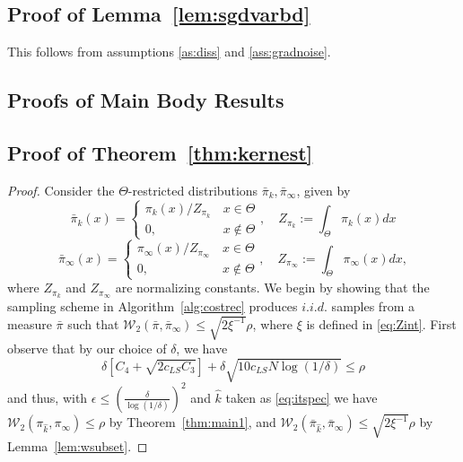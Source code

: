 \documentclass[journal,onecolumn]{IEEEtran}
\newcommand{\step}{\epsilon}
\newcommand{\dimn}{N}
\newcommand{\wass}{\mathcal{W}_2}
\newcommand{\gibbs}{\ids_{\infty}}
\newcommand{\dtlaw}{\ids_{k}} %
\newcommand{\LSconst}{c_{LS}}
\newcommand{\ids}{\pi}
\newcommand{\idw}{\gamma}
\newcommand{\ksp}{k,\idw}
\newcommand{\wassprox}{\rho}
\newcommand{\zconst}{\xi}
\newcommand{\hk}{\hat{k}}
\begin{document}
{{\color{black}\subsection*{Proof of Lemma~\ref{lem:sgdvarbd}}
This follows from assumptions \ref{as:diss} and \ref{ass:gradnoise}.}


\subsection{Proofs of Main Body Results}
\label{ap:resultspf}

{\color{black}\subsection*{Proof of Theorem~\ref{thm:kernest}}
\label{pf:kernest}
\begin{proof}
{\color{black}Consider the $\Theta$-restricted distributions $\bar{\pi}_k,\bar{\pi}_{\infty}$, given by
\[\bar{\pi}_k(x) = \begin{cases} \dtlaw(x)/Z_{\dtlaw} \, &x\in \Theta \\ 0, &x\notin \Theta \end{cases}, \quad Z_{\dtlaw} := \int_{\Theta}\dtlaw(x)dx\]
\[\bar{\pi}_{\infty}(x) = \begin{cases} \gibbs(x)/Z_{\gibbs} \, &x\in \Theta \\ 0, &x\notin \Theta \end{cases},\quad Z_{\gibbs} := \int_{\Theta}\gibbs(x)dx,\]
where $Z_{\dtlaw}$ and $Z_{\gibbs}$ are normalizing constants.}
 We begin by showing that the sampling scheme in Algorithm~\ref{alg:costrec} produces $i.i.d.$ samples from a measure $\bar{\pi}$ such that {\color{black}$\wass(\bar{\pi},\bar{\pi}_{\infty}) \leq \sqrt{2\zconst^{-1}}\wassprox$, where $\zconst$ is defined in \eqref{eq:Zint}}. First observe that by our choice of $\delta$, we have 
 \[\delta\left[C_4 + \sqrt{2\LSconst C_3} \right] + \delta\sqrt{10\LSconst\dimn\log\left(1/\delta\right)} \leq \wassprox \]
 and thus, with $\step \leq \left(\frac{\delta}{\log(1/\delta)} \right)^2$ and $\hk$ taken as \eqref{eq:itspec} we have $\wass(\pi_{\hk},\gibbs) \leq \wassprox$ by Theorem~\ref{thm:main1}, and $\wass(\bar{\pi}_{\hk},\bar{\pi}_{\infty}) \leq \sqrt{2\zconst^{-1}}\wassprox$ by Lemma~\ref{lem:wsubset}. 
 

\end{proof}}}
\end{document}
